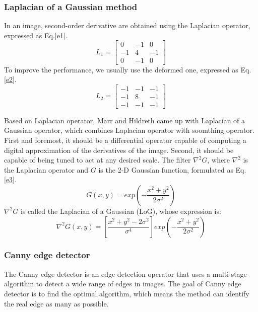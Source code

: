 \documentclass[journal]{IEEEtran}
\begin{document}
\subsubsection{Laplacian of a Gaussian method}
In an image, second-order derivative are obtained using the Laplacian operator, expressed as Eq.\ref{e1}.
\begin{equation}\label{e1}
L_{1}=
\begin{bmatrix}
0 &-1  &0 \\ 
-1 & 4 & -1\\ 
0 & -1 & 0
\end{bmatrix} 
\end{equation}
To improve the performance, we usually use the deformed one, expressed as Eq.\ref{e2}.
\begin{equation}\label{e2}
L_{2}=
\begin{bmatrix}
-1 &-1  &-1 \\ 
-1 & 8 & -1\\ 
-1 & -1 & -1
\end{bmatrix} 
\end{equation}

Based on Laplacian operator, Marr and Hildreth came up with Laplacian of a Gaussian operator, which combines Laplacian operator with soomthing operator. First and foremost, it should be a differential operator capable of computing a digital approximation of the derivatives of the image. Second, it should be capable of being tuned to act at any desired scale. The filter $\nabla^{2}G $, where $ \nabla^{2} $ is the Laplacian operator and $ G $ is the 2-D Gaussian function, formulated as Eq.\ref{e3}.
\begin{equation}\label{e3}
	G(x,y)=exp(-\dfrac{x^{2}+y^{2}}{2\sigma^{2}})
\end{equation}
$ \nabla^{2}G $ is called the Laplacian of a Gaussian (LoG), whose expression is:
\begin{equation}\label{e4}
 \nabla^{2}G(x,y) =[\dfrac{x^{2}+y^{2}-2\sigma^{2}}{\sigma^{4}}]exp(-\dfrac{x^{2}+y^{2}}{2\sigma^{2}})
\end{equation}

\subsubsection{Canny edge detector}
The Canny edge detector is an edge detection operator that uses a multi-stage algorithm to detect a wide range of edges in images. The goal of Canny edge detector is to find the optimal algorithm, which means the method can identify the real edge as many as possible. 
\end{document}
